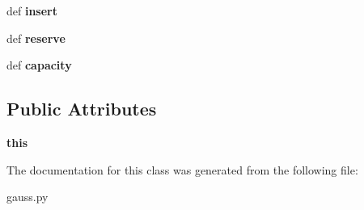 \begin{DoxyCompactItemize}
\item 
\hypertarget{classgauss_1_1_float_vector_ada1dbb2a72940c68efa68cadb89d4d6d}{def {\bfseries insert}}\label{classgauss_1_1_float_vector_ada1dbb2a72940c68efa68cadb89d4d6d}

\item 
\hypertarget{classgauss_1_1_float_vector_a169e303b58c15423496410ee58306528}{def {\bfseries reserve}}\label{classgauss_1_1_float_vector_a169e303b58c15423496410ee58306528}

\item 
\hypertarget{classgauss_1_1_float_vector_aaea25df019102e1370e192a4eac65380}{def {\bfseries capacity}}\label{classgauss_1_1_float_vector_aaea25df019102e1370e192a4eac65380}

\end{DoxyCompactItemize}
\subsection*{Public Attributes}
\begin{DoxyCompactItemize}
\item 
\hypertarget{classgauss_1_1_float_vector_ae4263039b860f179e9a7aed74320bc5a}{{\bfseries this}}\label{classgauss_1_1_float_vector_ae4263039b860f179e9a7aed74320bc5a}

\end{DoxyCompactItemize}


The documentation for this class was generated from the following file\-:\begin{DoxyCompactItemize}
\item 
gauss.\-py\end{DoxyCompactItemize}
